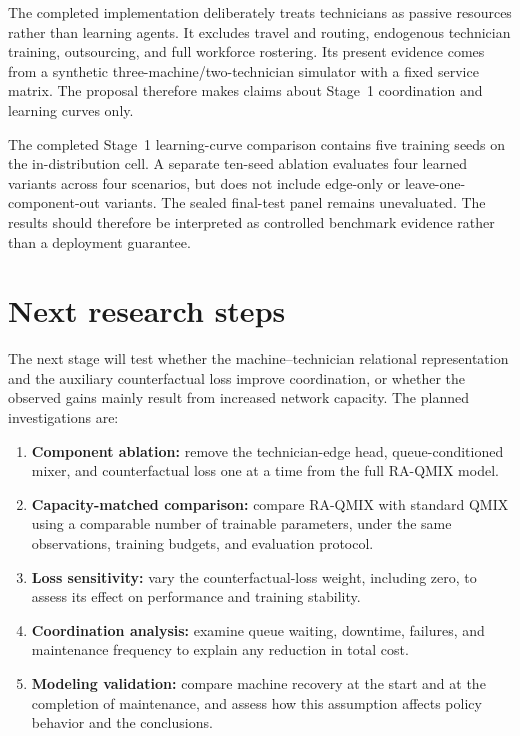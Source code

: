 \documentclass[11pt]{article}
\begin{document}
The completed implementation deliberately treats technicians as passive resources rather than learning agents. It excludes travel and routing, endogenous technician training, outsourcing, and full workforce rostering. Its present evidence comes from a synthetic three-machine/two-technician simulator with a fixed service matrix. The proposal therefore makes claims about Stage~1 coordination and learning curves only.

The completed Stage~1 learning-curve comparison contains five training seeds on the in-distribution cell. A separate ten-seed ablation evaluates four learned variants across four scenarios, but does not include edge-only or leave-one-component-out variants. The sealed final-test panel remains unevaluated. The results should therefore be interpreted as controlled benchmark evidence rather than a deployment guarantee.

\section{Next research steps}

The next stage will test whether the machine--technician relational representation and the auxiliary counterfactual loss improve coordination, or whether the observed gains mainly result from increased network capacity. The planned investigations are:
\begin{enumerate}[leftmargin=*]
    \item \textbf{Component ablation:} remove the technician-edge head, queue-conditioned mixer, and counterfactual loss one at a time from the full RA-QMIX model.
    \item \textbf{Capacity-matched comparison:} compare RA-QMIX with standard QMIX using a comparable number of trainable parameters, under the same observations, training budgets, and evaluation protocol.
    \item \textbf{Loss sensitivity:} vary the counterfactual-loss weight, including zero, to assess its effect on performance and training stability.
    \item \textbf{Coordination analysis:} examine queue waiting, downtime, failures, and maintenance frequency to explain any reduction in total cost.
    \item \textbf{Modeling validation:} compare machine recovery at the start and at the completion of maintenance, and assess how this assumption affects policy behavior and the conclusions.
\end{enumerate}
\end{document}
